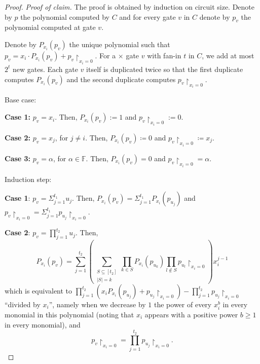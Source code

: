 \documentclass[11pt,letter]{article}
\theoremstyle{remark} %
\begin{document}
{\begin{proof}
        \noindent\textit{Proof of claim.}
        The proof is obtained by induction on circuit size. Denote by $p$ the polynomial computed by $C$ and for every gate $v$ in $C$ denote by $p_v$ the polynomial computed at gate $v$.\par
        Denote by $P_{x_i}(p_v)$ the unique polynomial such that $p_v = x_i \cdot P_{x_i}(p_v) + p_v \restriction_{x_i = 0}$. For a $\times$ gate $v$ with fan-in $t$ in $C$, we add at most $2^t$ new gates. Each gate $v$ itself is duplicated twice so that the first duplicate computes $P_{x_i}(p_v)$ and the second duplicate computes $p_v\restriction_{x_i = 0}$.\par
        Base case:\par
        \textbf{Case 1:} $p_v = x_i$. Then,  $P_{x_i}(p_v) := 1$ and $p_v\restriction_{x_i = 0} := 0$.\par
        \textbf{Case 2:} $p_v = x_j$, for $j \neq i$. Then, $P_{x_i}(p_v) \coloneqq 0$ and $p_v\restriction_{x_i= 0} \coloneqq x_j$.\par
        \textbf{Case 3:} $p_v = \alpha$, for $\alpha \in\mathbb{F}$. Then, $P_{x_i}(p_v) = 0$ and $p_v\restriction_{x_i = 0} = \alpha$.\par
        Induction step:\par
        \textbf{Case 1}: $p_v = \Sigma_{j=1}^{t_1} u_j$. Then, $P_{x_i}(p_v) =  \Sigma_{j=1}^{t_1} P_{x_i}(p_{u_j}) $ and $p_v \restriction_{x_i = 0} = \Sigma_{j=1}^{t_1} p_{u_j}\restriction_{x_i =0}$.\par
        \textbf{Case 2}: $p_v = \prod_{j=1}^{t_2} u_j$. Then, 
        \begin{equation*}
            P_{x_i}(p_v) = \sum_{j=1}^{t_2} \left ( \sum_{\substack{S \subseteq [t_2] \\ |S| = k} } \prod_{k \in S } P_{x_i}(p_{u_k}  )  \prod_{l \notin S} p_{u_l}\restriction_{x_i =0}\right) x_i^{j-1}
        \end{equation*}
        which is equivalent to
        $
            {\prod_{j=1}^{t_2} (x_i P_{x_i}(p_{u_j}) + p_{u_j} \restriction_{x_i = 0}) - \prod_{j=1}^{t_2} p_{u_j} \restriction_{x_i =0}}
        $
        ``divided by $x_i$'', namely when we decrease by $1$ the power of every $x_i^b$ in every monomial in this polynomial  (noting that $x_i$ appears with a positive power $b\ge 1$ in every monomial),
        and
        \begin{equation*}
            p_v \restriction_{x_i = 0} = \prod_{j=1}^{t_2} p_{u_j}\restriction_{x_i = 0}.

\end{equation*}
\end{proof}}
\end{document}
